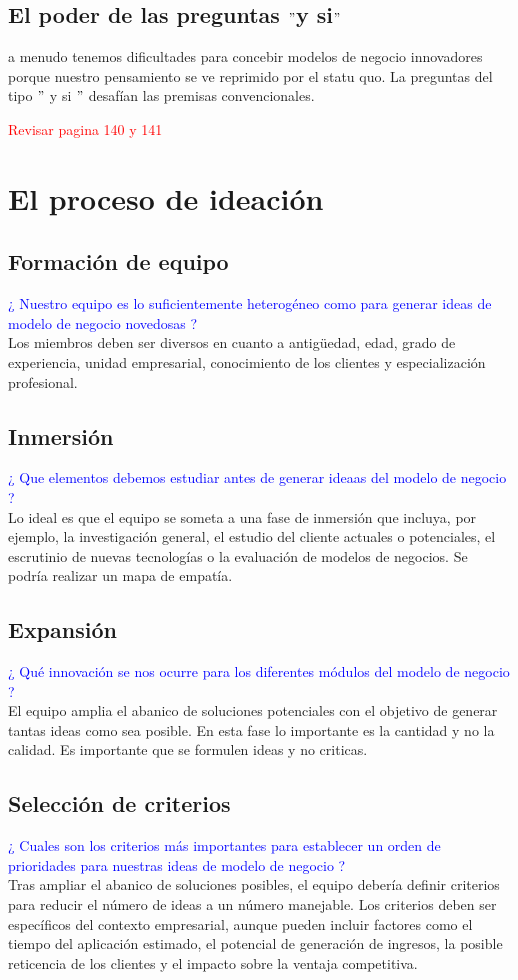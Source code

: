 \documentclass[11pt]{book}
\begin{document}
\subsection{El poder de las preguntas $"$y si$"$}
 a menudo tenemos dificultades para concebir modelos de negocio innovadores porque nuestro pensamiento se ve reprimido por el statu quo. La preguntas del tipo $"$ y si $"$  desafían las premisas convencionales.
\begin{flushright}
\textcolor{red}{Revisar pagina 140 y 141}
\end{flushright}
\section{El proceso de ideación}
\subsection{Formación de equipo}
\textcolor{blue}{ ¿ Nuestro equipo es lo suficientemente heterogéneo como para generar ideas de modelo de negocio novedosas ? }\\
Los miembros deben ser diversos en cuanto a antigüedad, edad, grado de experiencia, unidad empresarial, conocimiento de los clientes y especialización profesional.
\subsection{Inmersión}
\textcolor{blue}{ ¿ Que elementos debemos estudiar antes de generar ideaas del modelo de negocio ? }\\
Lo ideal es que el equipo se someta a una fase de inmersión que incluya, por ejemplo, la investigación general, el estudio del cliente actuales o potenciales, el escrutinio de nuevas tecnologías o la evaluación de modelos de negocios.
Se podría realizar un mapa de empatía.
\subsection{Expansión}
\textcolor{blue}{ ¿ Qué innovación se nos ocurre para los diferentes módulos del modelo de negocio ? }\\
El equipo amplia el abanico de soluciones potenciales con el objetivo de generar tantas ideas como sea posible. En esta fase lo importante es la cantidad y no la calidad. Es importante que se formulen ideas y no criticas.
\subsection{Selección de criterios}
\textcolor{blue}{ ¿ Cuales son los criterios más importantes para establecer un orden de prioridades para nuestras ideas de modelo de negocio ? }\\
Tras ampliar el abanico de soluciones posibles, el equipo debería definir criterios para reducir el número de ideas a un número manejable. Los criterios deben ser específicos del contexto empresarial, aunque pueden incluir factores como el tiempo del aplicación estimado, el potencial de generación de ingresos, la posible reticencia de los clientes y el impacto sobre la ventaja competitiva.
\end{document}
